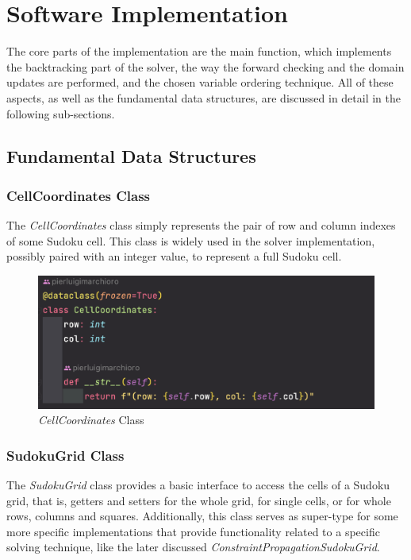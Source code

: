 \section{Software Implementation}

The core parts of the implementation are the main function, which implements the backtracking part of the solver, the way the forward checking and the domain updates are performed, and the chosen variable ordering technique. All of these aspects, as well as the fundamental data structures, are discussed in detail in the following sub-sections.

\subsection{Fundamental Data Structures}\label{cp_data_structs}

\subsubsection{CellCoordinates Class}

The \textit{CellCoordinates} class simply represents the pair of row and column indexes of some Sudoku cell. This class is widely used in the solver implementation, possibly paired with an integer value, to represent a full Sudoku cell.

\begin{figure}[h]
    \centering
    \includegraphics[scale=0.65]{assignment-1/images/cp/data-1-cell-coords.png}
    \caption{\textit{CellCoordinates} Class}
    \label{fig:data_1}
\end{figure}

\subsubsection{SudokuGrid Class}

The \textit{SudokuGrid} class provides a basic interface to access the cells of a Sudoku grid, that is, getters and setters for the whole grid, for single cells, or for whole rows, columns and squares.
Additionally, this class serves as super-type for some more specific implementations that provide functionality related to a specific solving technique, like the later discussed \textit{ConstraintPropagationSudokuGrid}.

